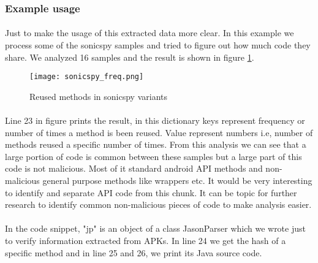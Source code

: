\documentclass[../main.tex]{subfile}
\begin{document}
		\subsubsection{Example usage}
		\paragraph{}Just to make the usage of this extracted data more clear. In this example we process some of the sonicspy samples and tried to figure out how much code they share. We analyzed 16 samples  and the result is shown in figure \ref{fig:sonicspy_freq}.
		
		\begin{figure}
			\texttt{[image: sonicspy\_freq.png]}
			\caption{Reused methods in sonicspy variants}
			\label{fig:sonicspy_freq}
		\end{figure}
		\paragraph{} Line 23 in figure prints the result, in this dictionary keys represent frequency or number of times a method is been reused. Value represent numbers i.e, number of methods reused a specific number of times. From this analysis we can see that a large portion of code is common between these samples but a large part of this code is not malicious. Most of it standard android API methods and non-malicious general purpose methods like wrappers etc. It would be very interesting to identify and separate API code from this chunk. It can be topic for further research to identify common non-malicious pieces of code to make analysis easier.
		
		\paragraph{} In the code snippet, "jp" is an object of a class JasonParser which we wrote just to verify information extracted from APKs. In line 24 we get the hash of a specific method and in line 25 and 26, we print its Java source code. 		
		
\end{document}
